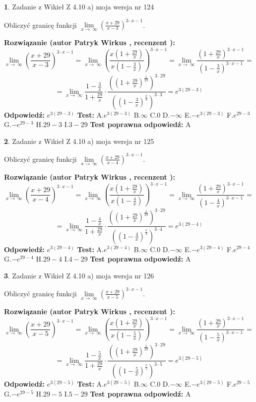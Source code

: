 \documentclass[12pt, a4paper]{article}
\theoremstyle{definition} %
\newtheorem{zad}{}
\newcommand{\zadStart}[1]{\begin{zad}#1\newline}
\newcommand{\zadStop}{\end{zad}}
\newcommand{\rozwStart}[2]{\noindent \textbf{Rozwiązanie (autor #1 , recenzent #2): }\newline}
\newcommand{\rozwStop}{\newline}
\newcommand{\odpStart}{\noindent \textbf{Odpowiedź:}\newline}
\newcommand{\odpStop}{\newline}
\newcommand{\testStart}{\noindent \textbf{Test:}\newline}
\newcommand{\testStop}{\newline}
\newcommand{\kluczStart}{\noindent \textbf{Test poprawna odpowiedź:}\newline}
\newcommand{\kluczStop}{\newline}
\begin{document}
\zadStart{Zadanie z Wikieł Z 4.10 a) moja wersja nr 124}


Obliczyć granicę funkcji  $\lim\limits_{x\to\ \infty}(\frac{x+29}{x-3})^{3\cdot x-1}$.
\zadStop
\rozwStart{Patryk Wirkus}{}
$$\lim\limits_{x\to\ \infty}(\frac{x+29}{x-3})^{3\cdot x-1} = \lim\limits_{x\to\ \infty}(\frac{x(1+\frac{29}{x})}{x(1-\frac{3}{x})})^{3\cdot x-1}=\lim\limits_{x\to\ \infty}\frac{(1+\frac{29}{x})^{3\cdot x-1}}{(1-\frac{3}{x})^{3\cdot x-1}}=$$
$$=\lim\limits_{x\to\ \infty}\frac{1-\frac{3}{x}}{1+\frac{29}{x}}\cdot\frac{((1+\frac{29}{x})^{\frac{x}{29}})^{3\cdot29}}{((1-\frac{3}{x})^{\frac{x}{3}})^{3\cdot3}}=e^{3(29-3)}$$
\rozwStop
\odpStart
$e^{3(29-3)}$
\odpStop
\testStart
A.$e^{3(29-3)}$ B.$\infty$ C.$0$ D.$-\infty$ E.$-e^{3(29-3)}$
F.$e^{29-3}$ G.$-e^{29-3}$
H.$29-3$
I.$3-29$
\testStop
\kluczStart
A
\kluczStop



\zadStart{Zadanie z Wikieł Z 4.10 a) moja wersja nr 125}


Obliczyć granicę funkcji  $\lim\limits_{x\to\ \infty}(\frac{x+29}{x-4})^{3\cdot x-1}$.
\zadStop
\rozwStart{Patryk Wirkus}{}
$$\lim\limits_{x\to\ \infty}(\frac{x+29}{x-4})^{3\cdot x-1} = \lim\limits_{x\to\ \infty}(\frac{x(1+\frac{29}{x})}{x(1-\frac{4}{x})})^{3\cdot x-1}=\lim\limits_{x\to\ \infty}\frac{(1+\frac{29}{x})^{3\cdot x-1}}{(1-\frac{4}{x})^{3\cdot x-1}}=$$
$$=\lim\limits_{x\to\ \infty}\frac{1-\frac{4}{x}}{1+\frac{29}{x}}\cdot\frac{((1+\frac{29}{x})^{\frac{x}{29}})^{3\cdot29}}{((1-\frac{4}{x})^{\frac{x}{4}})^{3\cdot4}}=e^{3(29-4)}$$
\rozwStop
\odpStart
$e^{3(29-4)}$
\odpStop
\testStart
A.$e^{3(29-4)}$ B.$\infty$ C.$0$ D.$-\infty$ E.$-e^{3(29-4)}$
F.$e^{29-4}$ G.$-e^{29-4}$
H.$29-4$
I.$4-29$
\testStop
\kluczStart
A
\kluczStop



\zadStart{Zadanie z Wikieł Z 4.10 a) moja wersja nr 126}


Obliczyć granicę funkcji  $\lim\limits_{x\to\ \infty}(\frac{x+29}{x-5})^{3\cdot x-1}$.
\zadStop
\rozwStart{Patryk Wirkus}{}
$$\lim\limits_{x\to\ \infty}(\frac{x+29}{x-5})^{3\cdot x-1} = \lim\limits_{x\to\ \infty}(\frac{x(1+\frac{29}{x})}{x(1-\frac{5}{x})})^{3\cdot x-1}=\lim\limits_{x\to\ \infty}\frac{(1+\frac{29}{x})^{3\cdot x-1}}{(1-\frac{5}{x})^{3\cdot x-1}}=$$
$$=\lim\limits_{x\to\ \infty}\frac{1-\frac{5}{x}}{1+\frac{29}{x}}\cdot\frac{((1+\frac{29}{x})^{\frac{x}{29}})^{3\cdot29}}{((1-\frac{5}{x})^{\frac{x}{5}})^{3\cdot5}}=e^{3(29-5)}$$
\rozwStop
\odpStart
$e^{3(29-5)}$
\odpStop
\testStart
A.$e^{3(29-5)}$ B.$\infty$ C.$0$ D.$-\infty$ E.$-e^{3(29-5)}$
F.$e^{29-5}$ G.$-e^{29-5}$
H.$29-5$
I.$5-29$
\testStop
\kluczStart
A
\kluczStop
\end{document}
